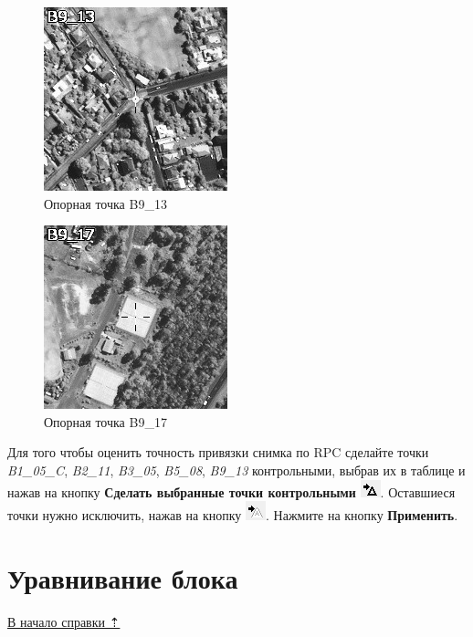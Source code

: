 \documentclass[
  12pt,
]{book}
\begin{document}
\begin{figure}
\centering
\includegraphics{images/Ref17/B9_13.jpeg}
\caption{Опорная точка B9\_13}
\end{figure}

\begin{figure}
\centering
\includegraphics{images/Ref17/B9_17.jpeg}
\caption{Опорная точка B9\_17}
\end{figure}

Для того чтобы оценить точность привязки снимка по RPC сделайте точки \emph{B1\_05\_C}, \emph{B2\_11}, \emph{B3\_05}, \emph{B5\_08}, \emph{B9\_13} контрольными, выбрав их в таблице и нажав на кнопку \textbf{Сделать выбранные точки контрольными} \includegraphics{images/Ref17/Control.png}. Оставшиеся точки нужно исключить, нажав на кнопку \includegraphics{images/Ref17/Excepted.png}. Нажмите на кнопку \textbf{Применить}.

\hypertarget{rpc-adjustment}{%
\section{Уравнивание блока}\label{rpc-adjustment}}

\protect\hyperlink{rpc}{В начало справки ⇡}
\end{document}
